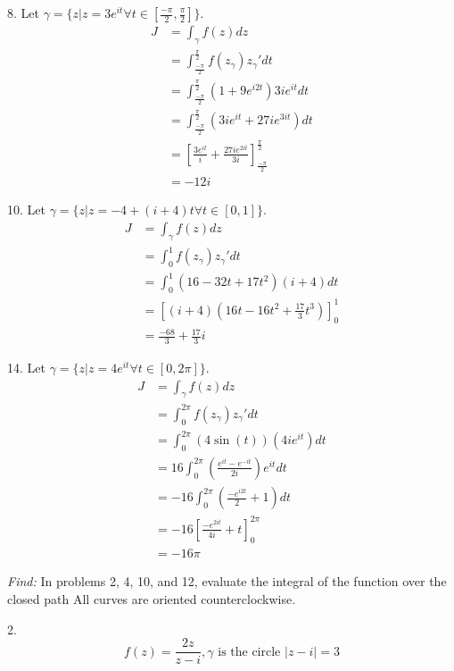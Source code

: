 \documentclass[11pt]{homework}
\begin{document}
8.  Let $\gamma = \{z | z = 3 e^{it} \forall t\in[\frac{-\pi}{2},\frac{\pi}{2}]\}$.
\begin{align*}
  J &= \int_\gamma f(z) dz \\
    &= \int_\frac{-\pi}{2}^{\frac{\pi}{2}} f(z_\gamma) z_\gamma' dt  \\
    &= \int_\frac{-\pi}{2}^{\frac{\pi}{2}} (1+9e^{i2t}) 3ie^{it} dt  \\
    &= \int_\frac{-\pi}{2}^{\frac{\pi}{2}} ( 3ie^{it} + 27i e^{3it}) dt   \\
    &= \left[ \frac{3e^{it}}{i} + \frac{27ie^{2it}}{3i} \right]_\frac{-\pi}{2}^\frac{\pi}{2}  \\
    &= -12i
\end{align*}

10. Let $\gamma = \{z | z = -4 + (i+4)t \forall t\in[0,1]\}$.
\begin{align*}
  J &= \int_\gamma f(z) dz \\
    &= \int_0^1 f(z_\gamma) z_\gamma' dt  \\
    &= \int_0^1 (16-32t+17t^2)(i+4) dt  \\
    &= \left[ (i+4)(16t - 16t^2+\frac{17}{3}t^3)\right]_0^1 \\
    &= \frac{-68}{3} + \frac{17}{3}i
\end{align*}

14. Let $\gamma = \{z | z = 4 e^{it} \forall t\in[0,2\pi]\}$.
\begin{align*}
  J &= \int_\gamma f(z) dz \\
    &= \int_0^{2\pi} f(z_\gamma) z_\gamma' dt  \\
    &= \int_0^{2\pi} (4\sin(t)) (4ie^{it}) dt \\
    &= 16 \int_0^{2\pi} \left(\frac{e^{it} - e^{-it}}{2i}\right) e^{it} dt  \\
    &= -16 \int_0^{2\pi} (\frac{-e^{i2t}}{2} +1) dt  \\
    &= -16 \left[ \frac{-e^{2it}}{4i} +t \right]_0^{2\pi} \\
    &= -16 \pi
\end{align*}

\newpage
{}
\emph{Find:}
\newline
In problems 2, 4, 10, and 12, 
evaluate the integral of the function over the closed path
All curves are oriented counterclockwise.

2.
\begin{equation*}
  f(z) = \frac{2z}{z-i}, \gamma \text{ is the circle } |z-i|=3
\end{equation*} 
\end{document}
